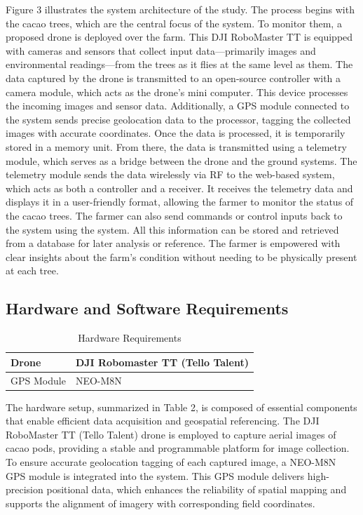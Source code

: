 Figure 3 illustrates the system architecture of the study. The process begins with the cacao trees, which are the central focus of the system. To monitor them, a proposed drone is deployed over the farm. This DJI RoboMaster TT is equipped with cameras and sensors that collect input data—primarily images and environmental readings—from the trees as it flies at the same level as them. The data captured by the drone is transmitted to an open-source controller with a camera module, which acts as the drone’s mini computer. This device processes the incoming images and sensor data. Additionally, a GPS module connected to the system sends precise geolocation data to the processor, tagging the collected images with accurate coordinates. Once the data is processed, it is temporarily stored in a memory unit. From there, the data is transmitted using a telemetry module, which serves as a bridge between the drone and the ground systems. The telemetry module sends the data wirelessly via RF to the web-based system, which acts as both a controller and a receiver. It receives the telemetry data and displays it in a user-friendly format, allowing the farmer to monitor the status of the cacao trees. The farmer can also send commands or control inputs back to the system using the system. All this information can be stored and retrieved from a database for later analysis or reference. The farmer is empowered with clear insights about the farm’s condition without needing to be physically present at each tree.


\subsection{Hardware and Software Requirements}

\begin{table}[H]
	\centering
	\caption{Hardware Requirements}
	\label{tab:hardreq}
	\begin{tabular}{ll}
		\toprule
		Drone      & DJI Robomaster TT (Tello Talent) \\
		\midrule
		GPS Module & NEO-M8N                          \\
		\bottomrule
	\end{tabular}
\end{table}

The hardware setup, summarized in Table 2, is composed of essential components that enable efficient data acquisition and geospatial referencing. The DJI RoboMaster TT (Tello Talent) drone is employed to capture aerial images of cacao pods, providing a stable and programmable platform for image collection. To ensure accurate geolocation tagging of each captured image, a NEO-M8N GPS module is integrated into the system. This GPS module delivers high-precision positional data, which enhances the reliability of spatial mapping and supports the alignment of imagery with corresponding field coordinates.

